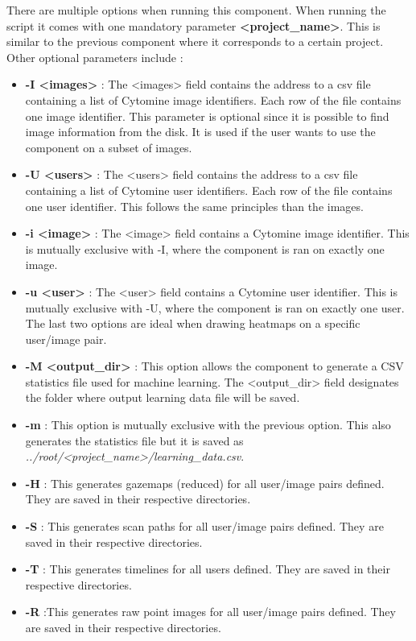 \documentclass[a4paper,11pt]{report}
\numberwithin{figure}{chapter} %
\begin{document}
    There are multiple options when running this component.
    When running the script it comes with one mandatory parameter \textbf{<project\_name>}.
    This is similar to the previous component where it corresponds to a certain project.
    Other optional parameters include :
    \begin{itemize}
        \item[\textbullet] \textbf{-I <images>} : The <images> field contains the address to a csv file containing a list of Cytomine image identifiers.
        Each row of the file contains one image identifier.
        This parameter is optional since it is possible to find image information from the disk.
        It is used if the user wants to use the component on a subset of images.
        \item[\textbullet] \textbf{-U <users>} : The <users> field contains the address to a csv file containing a list of Cytomine user identifiers.
        Each row of the file contains one user identifier.
        This follows the same principles than the images.
        \item[\textbullet] \textbf{-i <image>} : The <image> field contains a Cytomine image identifier.
        This is mutually exclusive with -I, where the component is ran on exactly one image.
        \item[\textbullet] \textbf{-u <user>} : The <user> field contains a Cytomine user identifier.
        This is mutually exclusive with -U, where the component is ran on exactly one user.
        The last two options are ideal when drawing heatmaps on a specific user/image pair.
        \item[\textbullet] \textbf{-M <output\_dir>} : This option allows the component to generate a CSV statistics file used for machine learning.
        The <output\_dir> field designates the folder where output learning data file will be saved.
        \item[\textbullet] \textbf{-m} : This option is mutually exclusive with the previous option.
        This also generates the statistics file but it is saved as \textit{../root/<project\_name>/learning\_data.csv}.
        \item[\textbullet] \textbf{-H} : This generates gazemaps (reduced) for all user/image pairs defined.
        They are saved in their respective directories.
        \item[\textbullet] \textbf{-S} : This generates scan paths for all user/image pairs defined.
        They are saved in their respective directories.
        \item[\textbullet] \textbf{-T} : This generates timelines for all users defined.
        They are saved in their respective directories.
        \item[\textbullet] \textbf{-R} :This generates raw point images for all user/image pairs defined.
        They are saved in their respective directories.
    \end{itemize}
\end{document}
